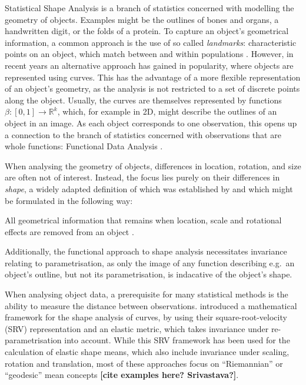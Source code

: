 Statistical Shape Analysis \parencite[see e.g.][]{DrydenMardia2016} is a branch of statistics concerned with modelling the geometry of objects.
Examples might be the outlines of bones and organs, a handwritten digit, or the folds of a protein.
To capture an object's geometrical information, a common approach is the use of so called \textit{landmarks}: characteristic points on an object, which match between and within populations \parencite[see][3]{DrydenMardia2016}.
However, in recent years an alternative approach has gained in popularity, where objects are represented using curves.
This has the advantage of a more flexible representation of an object's geometry, as the analysis is not restricted to a set of discrete points along the object.
Usually, the curves are themselves represented by functions $\beta : [0,1] \rightarrow \mathbb{R}^k$, which, for example in 2D, might describe the outlines of an object in an image. 
As each object corresponds to one observation, this opens up a connection to the branch of statistics concerned with observations that are whole functions: Functional Data Analysis \parencite[see e.g.][]{RamsaySilverman2005}.

When analysing the geometry of objects, differences in location, rotation, and size are often not of interest.
Instead, the focus lies purely on their differences in  \textit{shape}, a widely adapted definition of which was established by \cite{Kendall1977} and which might be formulated in the following way:
\begin{definition}[Shape] 
    All geometrical information that remains when location, scale and rotational effects are removed from an object \parencite[see][1]{DrydenMardia2016}.
\end{definition}
\noindent Additionally, the functional approach to shape analysis necessitates invariance relating to parametrisation, as only the image of any function describing e.g.\ an object's outline, but not its parametrisation, is indacative of the object's shape.

When analysing object data, a prerequisite for many statistical methods is the ability to measure the distance between observations.
\cite{SrivastavaEtAl2011} introduced a mathematical framework for the shape analysis of curves, by using their square-root-velocity (SRV) representation and an elastic metric, which takes invariance under re-parametrisation into account.
While this SRV framework has been used for the calculation of elastic shape means, which also include invariance under scaling, rotation and translation, most of these approaches focus on \enquote{Riemannian} or \enquote{geodesic} mean concepts \textbf{[cite examples here? Srivastava?]}.

